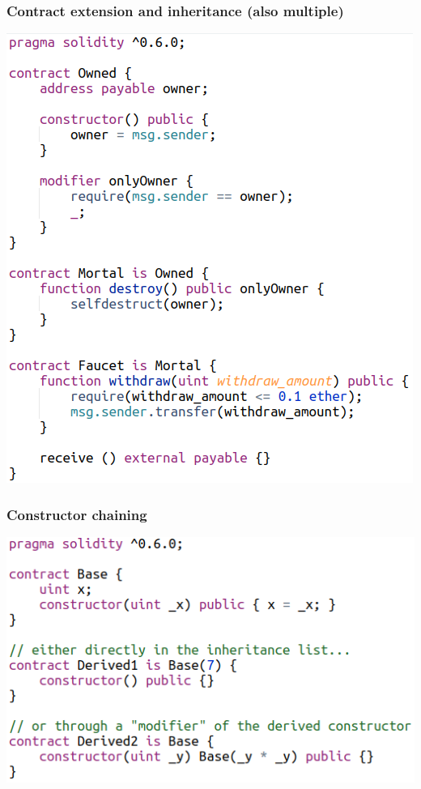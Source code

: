 \documentclass[11pt]{beamer}  %
\begin{document}
\begin{frame}\frametitle{Contract extension and inheritance (also multiple)}

  \begin{greenbox}{}
    \begin{center}
      \includegraphics[scale=0.38,clip=false]{pictures/subcontracts.png}
    \end{center}
  \end{greenbox}

\end{frame}

\begin{frame}\frametitle{Constructor chaining}

  \begin{greenbox}{}
    \begin{center}
      \includegraphics[scale=0.5,clip=false]{pictures/constructor_chaining.png}
    \end{center}
  \end{greenbox}

\end{frame}
\end{document}
